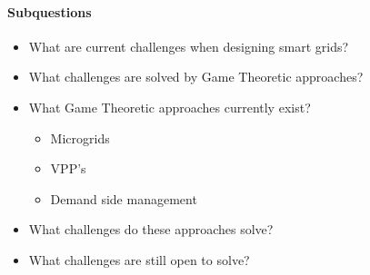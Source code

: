 \paragraph{Subquestions}
\begin{itemize}
	\item What are current challenges when designing smart grids?
	\item What challenges are solved by Game Theoretic approaches?
	\item What Game Theoretic approaches currently exist?
	\begin{itemize}
		\item Microgrids
		\item VPP’s
		\item Demand side management
	\end{itemize}
	\item What challenges do these approaches solve?
	\item What challenges are still open to solve?
\end{itemize}

